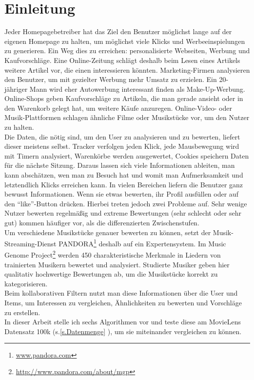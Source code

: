 \section{Einleitung}\label{s.Einleitung}\raggedbottom 
Jeder Homepagebetreiber hat das Ziel den Benutzer möglichst lange auf der eigenen Homepage zu halten, um möglichst viele Klicks und Werbeeinspielungen zu generieren. Ein Weg dies zu erreichen: personalisierte Webseiten, Werbung und Kaufvorschläge. Eine Online-Zeitung schlägt deshalb beim Lesen eines Artikels weitere Artikel vor, die einen interessieren könnten. Marketing-Firmen analysieren den Benutzer, um mit gezielter Werbung mehr Umsatz zu erzielen. Ein 20-jähriger Mann wird eher Autowerbung interessant finden als Make-Up-Werbung. Online-Shops geben Kaufvorschläge zu Artikeln, die man gerade ansieht oder in den Warenkorb gelegt hat, um weitere Käufe anzuregen. Online-Video- oder Musik-Plattformen schlagen ähnliche Filme oder Musikstücke vor, um den Nutzer zu halten.\\
Die Daten, die nötig sind, um den User zu analysieren und zu bewerten, liefert dieser meistens selbst. Tracker verfolgen jeden Klick, jede Mausbewegung wird mit Timern analysiert, Warenkörbe werden ausgewertet, Cookies speichern Daten für die nächste Sitzung. Daraus lassen sich viele Informationen ableiten, man kann abschätzen, wen man zu Besuch hat und womit man Aufmerksamkeit und letztendlich Klicks erreichen kann. In vielen Bereichen liefern die Benutzer ganz bewusst Informationen. Wenn sie etwas bewerten, ihr Profil ausfüllen oder auf den "`like"'-Button drücken. Hierbei treten jedoch zwei Probleme auf. Sehr wenige Nutzer bewerten regelmäßig und extreme Bewertungen (sehr schlecht oder sehr gut) kommen häufiger vor, als die differenzierten Zwischenstufen.\\
Um verschiedene Musikstücke genauer bewerten zu können, setzt der Musik-Streaming-Dienst PANDORA\footnote{\url{www.pandora.com}} deshalb auf ein Expertensystem. Im Music Genome Project\footnote{\url{http://www.pandora.com/about/mgp}} werden 450 charakteristische Merkmale in Liedern von trainierten Musikern bewertet und analysiert. Studierte Musiker geben hier qualitativ hochwertige Bewertungen ab, um die Musikstücke korrekt zu kategorisieren.\\
Beim kollaborativen Filtern nutzt man diese Informationen über die User und Items, um Interessen zu vergleichen, Ähnlichkeiten zu bewerten und Vorschläge zu erstellen.\\ In dieser Arbeit stelle ich sechs Algorithmen vor und teste diese am MovieLens Datensatz 100k (s.\autoref{s.Datenmenge} ), um sie miteinander vergleichen zu können.

\clearpage

